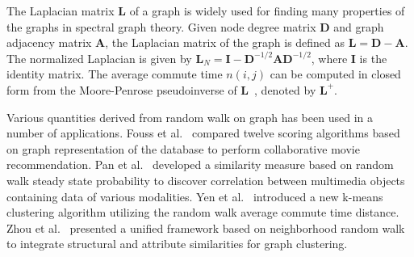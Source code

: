 
The Laplacian matrix $\mathbf{L}$ of a graph is widely used for finding many properties of the graphs in spectral graph theory. Given node degree matrix $\mathbf{D}$ and graph adjacency matrix $\mathbf{A}$, the Laplacian matrix of the graph is defined as $\mathbf{L}=\mathbf{D}-\mathbf{A}$. The normalized Laplacian is given by $\mathbf{L}_N=\mathbf{I}-\mathbf{D}^{-1/2}\mathbf{A}\mathbf{D}^{-1/2}$, where $\mathbf{I}$ is the identity matrix. The average commute time $n(i,j)$ can be computed in closed form from the Moore-Penrose pseudoinverse of $\mathbf{L}$~\cite{pseudo}, denoted by $\mathbf{L}^+$.

Various quantities derived from random walk on graph has been used in a number of applications. Fouss et al.~\cite{Fouss06random-walkcomputation} compared twelve scoring algorithms based on graph representation of the database to perform collaborative movie recommendation. Pan et al.~\cite{Pan} developed a similarity measure based on random walk steady state probability to discover correlation between multimedia objects containing data of various modalities. Yen et al.~\cite{Yen05clusteringusing} introduced a new k-means clustering algorithm utilizing the random walk average commute time distance. Zhou et al.~\cite{Zhou:2009:GCB:1687627.1687709} presented a unified framework based on neighborhood random walk to integrate structural and attribute similarities for graph clustering.



